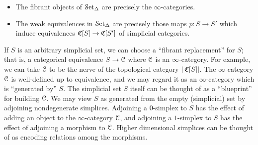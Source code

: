 \begin{1.2.14 Presentations of inf-cats}
\begin{itemize}
\item The fibrant objects of $\operatorname{\mathcal{S}et_{\Delta}}$ are precisely the
$\infty$-categories.

\item The weak equivalences in $\operatorname{\mathcal{S}et_{\Delta}}$ are precisely those maps
$p: S \rightarrow S'$ which induce equivalences $\operatorname{\mathfrak{C}}[S] \rightarrow \operatorname{\mathfrak{C}}[S']$
of simplicial categories.
\end{itemize}

If $S$ is an arbitrary simplicial set, we can
choose a ``fibrant replacement'' for $S$; that is, a categorical
equivalence $S \rightarrow \operatorname{\mathcal{C}}$ where $\operatorname{\mathcal{C}}$ is an $\infty$-category. 
For example, we can take $\operatorname{\mathcal{C}}$ to be the nerve of the topological
category $| \operatorname{\mathfrak{C}}[S] |$. 
The $\infty$-category $\operatorname{\mathcal{C}}$ is
well-defined up to equivalence, and we may
regard it as an $\infty$-category which is ``generated by'' $S$. The simplicial set $S$ itself can be thought of as a ``blueprint'' for building $\operatorname{\mathcal{C}}$. We may view $S$ as generated from the empty (simplicial) set by adjoining nondegenerate simplices. Adjoining a $0$-simplex to $S$ has the effect of adding an object to the $\infty$-category $\operatorname{\mathcal{C}}$, and adjoining a $1$-simplex to $S$ has the effect of adjoining a morphism to $\operatorname{\mathcal{C}}$. Higher dimensional simplices can be thought of as encoding relations among the morphisms.
\end{1.2.14 Presentations of inf-cats}
